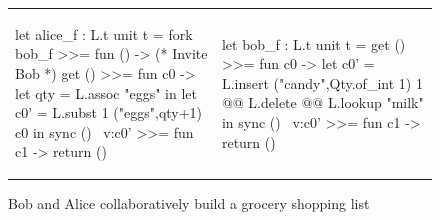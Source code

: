 \begin{figure}
\centering
\begin{tabular}{l||l}
\begin{ocaml}
let alice_f : L.t unit t =
  fork bob_f >>= fun () -> (* Invite Bob *)
  get () >>= fun c0 ->
  let qty = L.assoc "eggs" in
  let c0' = L.subst 1 ("eggs",qty+1) c0 in
  sync () ~v:c0' >>=
  fun c1 -> return ()
\end{ocaml}
&
\begin{ocaml}
let bob_f : L.t unit t =
  get () >>= fun c0 ->
  let c0' = L.insert ("candy",Qty.of_int 1) 1 @@
            L.delete @@ L.lookup "milk" in
  sync () ~v:c0' >>=
  fun c1 -> return ()
\end{ocaml}
\\
\end{tabular}
\caption{Bob and Alice collaboratively build a grocery shopping list}
\label{fig:shopping-list-code}
\end{figure}
